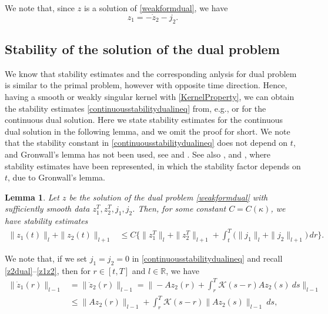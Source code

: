 \documentclass{amsart}
\numberwithin{equation}{section}
\newtheorem{lemma}{Lemma}
\theoremstyle{definition}
\begin{document}
We note that, since $z$ is a solution of \eqref{weakformdual}, 
we have 
\begin{equation}   \label{z1z2}
  z_1=-\dot z_2-j_2.
\end{equation}
\subsection{Stability of the solution of the dual problem}
We know that stability estimates and the corresponding anlysis for 
dual problem is similar to the primal problem, however with opposite 
time direction. 
Hence, having a smooth or weakly singular kernel with 
\eqref{KernelProperty}, we can obtain the stability estimates 
\eqref{continuousstabilitydualineq} from, e.g., \cite{Stig1} or \cite{StigFardin} 
for the continuous dual solution. Here we state stability estimates for 
the continuous dual solution in the following lemma, 
and we omit the proof for short. 
We note that the stability constant in \eqref{continuousstabilitydualineq} 
does not depend on $t$, and Gronwall's lemma has not been used, 
see \cite{Stig1} and \cite{StigFardin}.  
See also \cite{RiveraMenzala1999}, \cite{RiviereShawWhiteman2007} and 
\cite{ShawWhiteman},  where stability estimates have been represented, 
in which the stability factor depends on $t$, due to Gronwall's lemma. 
\begin{lemma}
Let $z$ be the solution of the dual problem
\eqref{weakformdual} with sufficiently smooth data
$z_1^T,z_2^T, j_1,j_2$. Then, for some constant $C=C(\kappa)$, we have stability estimates
\begin{equation}   \label{continuousstabilitydualineq}
  \begin{split}
    \|z_1(t)\|_l+\|z_2(t)\|_{l+1}
    &\le C\Big\{\|z_1^T\|_l+\|z_2^T\|_{l+1}
    +\int_t^T\!\Big(\|j_1\|_l+\|j_2\|_{l+1} \Big)\,dr\Big\}.
  \end{split}
\end{equation}
\end{lemma}
We note that, if we set $j_1=j_2=0$ in \eqref{continuousstabilitydualineq} 
and recall \eqref{z2dual}--\eqref{z1z2}, 
then for $r\in[t,T]$ and $l\in \mathbb{R}$, we have
\begin{equation*}
  \begin{split}
    \|\dot z_1(r)\|_{l-1}
    &=\|\ddot z_2(r)\|_{l-1}
    =\big\| -Az_2(r)+\int_r^T\! {\mathcal K}(s-r)Az_2(s)\ ds\big\|_{l-1}\\
    &\le \| Az_2(r)\|_{l-1} +\int_r^T\! {\mathcal K}(s-r) \| Az_2(s)\|_{l-1}\ ds,
  \end{split}
\end{equation*}
\end{document}
